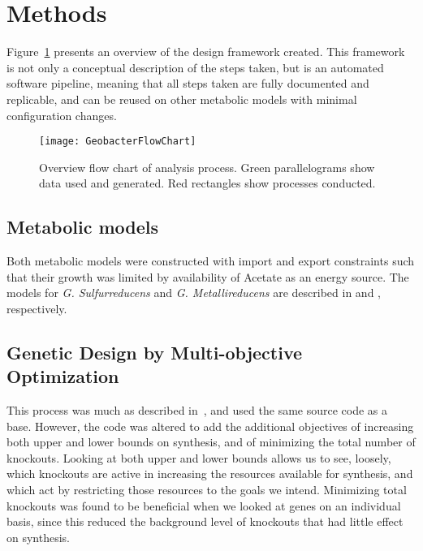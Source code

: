 \documentclass[a4paper,twocolumn]{article}
\begin{document}
\section{Methods}

Figure~\ref{fig:flowdiagram} presents an overview of the design framework created. This framework is not only a conceptual description of the steps taken, but is an automated software pipeline, meaning that all steps taken are fully documented and replicable, and can be reused on other metabolic models with minimal configuration changes. 

\begin{figure}[!htb]
\texttt{[image: GeobacterFlowChart]}
\caption{Overview flow chart of analysis process. Green parallelograms show data used and generated. Red rectangles show processes conducted.}
\label{fig:flowdiagram}
\end{figure}

\subsection{Metabolic models}
Both metabolic models were constructed with import and export constraints such that their growth was limited by availability of Acetate as an energy source. The models for {\it G. Sulfurreducens} and {\it G. Metallireducens }are described in \cite{Mahadevan2006} and \cite{Sun2009}, respectively.

\subsection{Genetic Design by Multi-objective Optimization}
This process was much as described in~\cite{Costanza2012}, and used the same source code as a base. However, the code was altered to add the additional objectives of increasing both upper and lower bounds on synthesis, and of minimizing the total number of knockouts. Looking at both upper and lower bounds allows us to see, loosely, which knockouts are active in increasing the resources available for synthesis, and which act by restricting those resources to the goals we intend. Minimizing total knockouts was found to be beneficial when we looked at genes on an individual basis, since this reduced the background level of knockouts that had little effect on synthesis.
\end{document}

